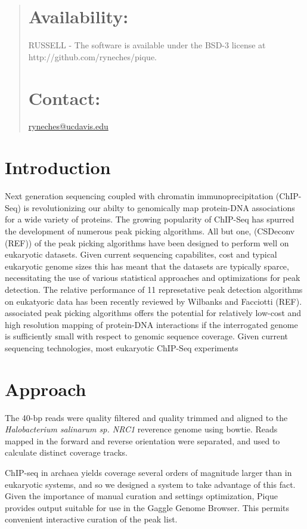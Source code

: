 \documentclass{bioinfo}
\begin{document}
{\begin{abstract}
\section{Availability:} 
RUSSELL - The software is available under the BSD-3 license at http://github.com/ryneches/pique.

\section{Contact:} \href{ryneches@ucdavis.edu}{ryneches@ucdavis.edu}

\end{abstract}

\section{Introduction}
Next generation sequencing coupled with chromatin immunoprecipitation (ChIP-Seq) is revolutionizing our abilty to genomically map protein-DNA associations for a wide variety of proteins.  The growing popularity of ChIP-Seq has spurred the  development of numerous peak picking algorithms.  All but one, (CSDeconv (REF)) of the peak picking algorithms have been designed to perform well on eukaryotic datasets.  Given current sequencing capabilites, cost and typical eukaryotic genome sizes this has meant that the datasets are typically sparce, necessitating the use of various statistical approaches and optimizations for  peak detection. The relative performance of 11 represetative peak detection algorithms on eukatyoric data has been recently reviewed by Wilbanks and Facciotti (REF). associated peak picking algorithms offers the potential for relatively low-cost and high resolution mapping of protein-DNA interactions if the interrogated genome is sufficiently small with respect to genomic sequence coverage.  Given current sequencing technologies, most eukaryotic ChIP-Seq experiments

\section{Approach}
The 40-bp reads were quality filtered and quality trimmed and aligned
to the {\em Halobacterium salinarum sp. NRC1} reverence genome using
bowtie. Reads mapped in the forward and reverse orientation were
separated, and used to calculate distinct coverage tracks.


ChIP-seq in archaea yields coverage several orders of magnitude larger
than in eukaryotic systems, and so we designed a system to take
advantage of this fact. Given the importance of manual curation and
settings optimization, Pique provides output suitable for use in the
Gaggle Genome Browser. This permits convenient interactive curation of
the peak list. 

}
\end{document}
